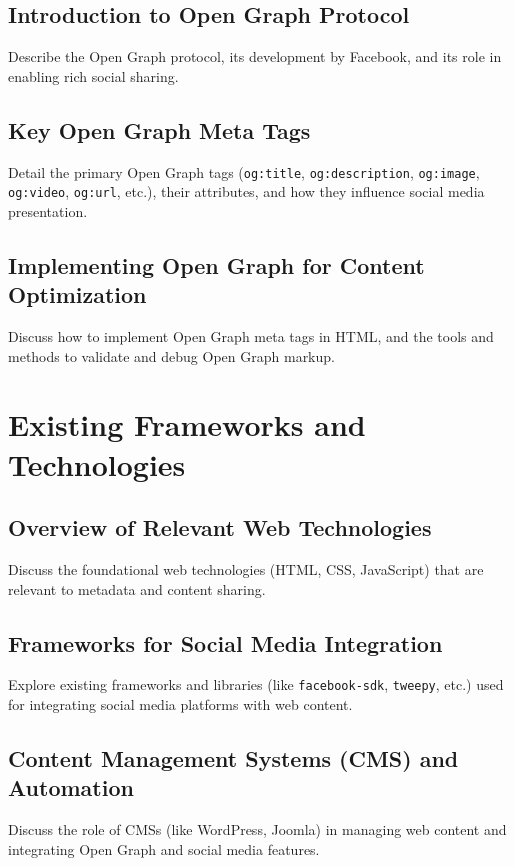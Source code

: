 \subsection{Introduction to Open Graph Protocol}
\label{subsec:introduction_to_open_graph_protocol}
Describe the Open Graph protocol, its development by Facebook, and its role in enabling rich social sharing.

\subsection{Key Open Graph Meta Tags}
\label{subsec:key_open_graph_meta_tags}
Detail the primary Open Graph tags (\texttt{og:title}, \texttt{og:description}, \texttt{og:image}, \texttt{og:video}, \texttt{og:url}, etc.), their attributes, and how they influence social media presentation.

\subsection{Implementing Open Graph for Content Optimization}
\label{subsec:implementing_open_graph_for_content_optimization}
Discuss how to implement Open Graph meta tags in HTML, and the tools and methods to validate and debug Open Graph markup.

\section{Existing Frameworks and Technologies}
\label{sec:frameworks_technologies}

\subsection{Overview of Relevant Web Technologies}
\label{subsec:overview_of_relevant_web_technologies}
Discuss the foundational web technologies (HTML, CSS, JavaScript) that are relevant to metadata and content sharing.

\subsection{Frameworks for Social Media Integration}
\label{subsec:frameworks_for_social_media_integration}
Explore existing frameworks and libraries (like \texttt{facebook-sdk}, \texttt{tweepy}, etc.) used for integrating social media platforms with web content.

\subsection{Content Management Systems (CMS) and Automation}
\label{subsec:content_management_systems_cms_and_automation}
Discuss the role of CMSs (like WordPress, Joomla) in managing web content and integrating Open Graph and social media features.

